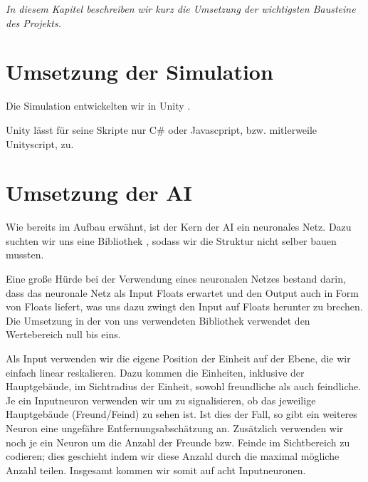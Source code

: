 \documentclass[
	12pt,
	a4paper,
	BCOR10mm,
	DIV14,
	headsepline,
	usegeometry,
]{scrreprt}
\begin{document}
\textit{%
In diesem Kapitel beschreiben wir kurz die Umsetzung der wichtigsten Bausteine des Projekts.
}

\bigskip

\section{Umsetzung der Simulation}

Die Simulation entwickelten wir in Unity \cite{unity}.

Unity lässt für seine Skripte nur C\# oder Javascpript, bzw. mitlerweile Unityscript, zu.


\section{Umsetzung der AI}
Wie bereits im Aufbau erwähnt, ist der Kern der AI ein neuronales Netz.
Dazu suchten wir uns eine Bibliothek \cite{nn-bib}, sodass wir die Struktur nicht selber bauen mussten.

Eine große Hürde bei der Verwendung eines neuronalen Netzes bestand darin, dass das neuronale Netz als Input Floats erwartet und den Output auch in Form von Floats liefert, was uns dazu zwingt den Input auf Floats herunter zu brechen.
Die Umsetzung in der von uns verwendeten Bibliothek verwendet den Wertebereich null bis eins.

Als Input verwenden wir die eigene Position der Einheit  auf der Ebene, die wir einfach linear reskalieren.
Dazu kommen die Einheiten, inklusive der Hauptgebäude, im Sichtradius der Einheit, sowohl freundliche als auch feindliche.
Je ein Inputneuron verwenden wir um zu signalisieren, ob das jeweilige Hauptgebäude (Freund/Feind) zu sehen ist.
Ist dies der Fall, so gibt ein weiteres Neuron eine ungefähre Entfernungsabschätzung an.
Zusätzlich verwenden wir noch je ein Neuron um die Anzahl der Freunde bzw. Feinde im Sichtbereich zu codieren; dies geschieht indem wir diese Anzahl durch die maximal mögliche Anzahl teilen.
Insgesamt kommen wir somit auf acht Inputneuronen.
\end{document}
